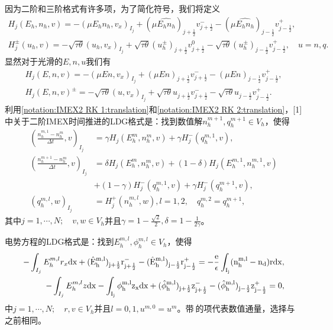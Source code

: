 因为二阶和三阶格式有许多项，为了简化符号，我们将定义
\begin{align}
    H_j(E_h,n_h,v) = - (\mu E_h n_h, v_x)_{I_j} + (\mu \hat{E_h n_h})_{j+\frac{1}{2}}v_{j+\frac{1}{2}}^- - (\mu \hat{E_h n_h})_{j-\frac{1}{2}}v_{j-\frac{1}{2}}^+, \label{notation:IMEX2 RK 1:translation} \\
    H_j^{\pm}(u_h,v) =- \sqrt{\tau \theta}(u_h,v_x)_{I_j} + \sqrt{\tau\theta}(u_h^{\pm})_{j+\frac{1}{2}}v_{j+\frac{1}{2}}^0 - \sqrt{\tau\theta}(u_h^{\pm})_{j-\frac{1}{2}}v_{j-\frac{1}{2}}^+,\quad u = n,q.\label{notation:IMEX2 RK 2:translation}
\end{align}
显然对于光滑的$E,n,u$我们有
\begin{align*}
    H_j(E,n,v) = -(\mu En,v_x)_{I_j} + (\mu En)_{j+\frac{1}{2}}v_{j+\frac{1}{2}}^- - (\mu En)_{j-\frac{1}{2}}v_{j-\frac{1}{2}}^+, \\
    H_j(E,n,v)^{\pm} = - \sqrt{\tau\theta}(u,v_x)_{I_j} + \sqrt{\tau\theta}u_{j+\frac{1}{2}}v_{j+\frac{1}{2}}^- - \sqrt{\tau\theta}u_{j-\frac{1}{2}}v_{j-\frac{1}{2}}^+.
\end{align*}
利用\eqref{notation:IMEX2 RK 1:translation}和\eqref{notation:IMEX2 RK 2:translation}，[1]中关于二阶IMEX时间推进的LDG格式是：找到数值解$n_h^{m+1},q_h^{m+1}\in V_h$，使得
\begin{align}
    (\frac{n_h^{m,1} -n_h^m}{\Delta t},v)_{I_j} & = \gamma H_j(E_h^m,n_h^m,v) + \gamma H_j^-(q_h^{m,1},v),                     \label{weakForm:IMEX2 LDG 1:translation} \\
    (\frac{n_h^{m+1} -n_h^m}{\Delta t},v)_{I_j} & = \delta H_j(E_h^m,n_h^m,v) + (1-\delta)H_j(E_h^{m,1},n_h^{m,1},v) \nonumber                                          \\
                                                & +(1-\gamma)H_j^-(q_h^{m,1},v) + \gamma H_j^-(q_h^{m+1},v),                                                            \\
    (q_h^{m,l},w)_{I_j}                         & = H_j^+(n_h^{m,l},w), l = 1,2, \quad q_h^{m,2} = q_h^{m+1},\label{weakForm:IMEX2 LDG 3:translation}
\end{align}
其中$j = 1,\cdots,N;\quad v,w \in V_h$并且$\gamma = 1- \frac{\sqrt{2}}{2},\delta = 1 - \frac{1}{2\gamma}$。

电势方程的LDG格式是：找到$E_h^{m,l},\phi_h^{m,l} \in V_h$，使得
\begin{align}
    -\int_{I_j} E_h^{m,l}r_x \rm{d}x + (\hat{E}_h^{m,l})_{j+\frac{1}{2}}r_{j+\frac{1}{2}}^- - (\hat{E}_h^{m,l})_{j-\frac{1}{2}}r_{j-\frac{1}{2}}^+ = -\frac{e}{\epsilon}\int_{I_j}(n_h^{m,l} - n_d) r\rm{d} x, \label{equation:IMEX2 LDG:EPE 1:translation} \\
    -\int_{I_j} E_h^{m,l}z \rm{d}x - \int_{I_j} \phi_h^{m,l}z_x \rm{d}x  + (\hat{\phi}_h^{m,l})_{j+\frac{1}{2}}z^-_{j+\frac{1}{2}} - (\hat{\phi}_h^{m,l})_{j-\frac{1}{2}}z_{j-\frac{1}{2}}^+  = 0, \label{equation:IMEX2 LDG:EPE 2:translation}
\end{align}
中$j = 1,\cdots,N;\quad r,v \in V_h$并且$l = 0,1, u^{m,0} = u^m$。带$\hat{\ }$的项代表数值通量，选择与之前相同。

